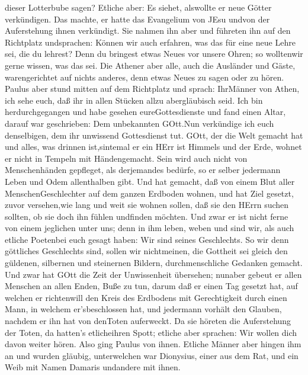 dieser Lotterbube sagen? Etliche aber: Es siehet, alswollte er neue
Götter verkündigen. Das machte, er hatte das Evangelium von JEsu undvon
der Auferstehung ihnen verkündigt.  Sie nahmen ihn aber und
führeten ihn auf den Richtplatz undsprachen: Können wir auch erfahren,
was das für eine neue Lehre sei, die du lehrest?  Denn du
bringest etwas Neues vor unsere Ohren; so wolltenwir gerne wissen, was
das sei.  Die Athener aber alle, auch die Ausländer und
Gäste, warengerichtet auf nichts anderes, denn etwas Neues zu sagen oder
zu hören.  Paulus aber stund mitten auf dem Richtplatz und
sprach: IhrMänner von Athen, ich sehe euch, daß ihr in allen Stücken
allzu abergläubisch seid.  Ich bin herdurchgegangen und
habe gesehen eureGottesdienste und fand einen Altar, darauf war
geschrieben: Dem unbekannten GOtt.Nun verkündige ich euch denselbigen,
dem ihr unwissend Gottesdienst tut.  GOtt, der die Welt
gemacht hat und alles, was drinnen ist,sintemal er ein HErr ist Himmels
und der Erde, wohnet er nicht in Tempeln mit Händengemacht.
 Sein wird auch nicht von Menschenhänden gepfleget, als
derjemandes bedürfe, so er selber jedermann Leben und Odem allenthalben
gibt.  Und hat gemacht, daß von einem Blut aller
MenschenGeschlechter auf dem ganzen Erdboden wohnen, und hat Ziel
gesetzt, zuvor versehen,wie lang und weit sie wohnen sollen,
 daß sie den HErrn suchen sollten, ob sie doch ihn fühlen
undfinden möchten. Und zwar er ist nicht ferne von einem jeglichen unter
uns;  denn in ihm leben, weben und sind wir, als auch
etliche Poetenbei euch gesagt haben: Wir sind seines Geschlechts.
 So wir denn göttliches Geschlechts sind, sollen wir
nichtmeinen, die Gottheit sei gleich den güldenen, silbernen und
steinernen Bildern, durchmenschliche Gedanken gemacht.  Und
zwar hat GOtt die Zeit der Unwissenheit übersehen; nunaber gebeut er
allen Menschen an allen Enden, Buße zu tun,  darum daß er
einen Tag gesetzt hat, auf welchen er richtenwill den Kreis des
Erdbodens mit Gerechtigkeit durch einen Mann, in welchem er'sbeschlossen
hat, und jedermann vorhält den Glauben, nachdem er ihn hat von denToten
auferweckt.  Da sie höreten die Auferstehung der Toten, da
hatten's etlicheihren Spott; etliche aber sprachen: Wir wollen dich
davon weiter hören.  Also ging Paulus von ihnen.
 Etliche Männer aber hingen ihm an und wurden gläubig,
unterwelchen war Dionysius, einer aus dem Rat, und ein Weib mit Namen
Damaris undandere mit ihnen.

